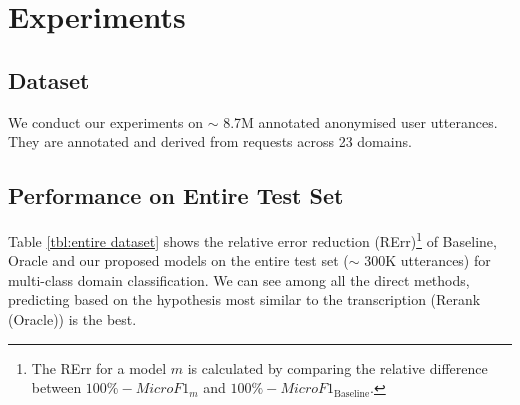 \section{Experiments}
\label{speech:exp}
\subsection{Dataset}
We conduct our experiments on $\sim$ 8.7M annotated anonymised user utterances. They are annotated and derived from requests across 23 domains. 
\subsection{Performance on Entire Test Set}

Table \ref{tbl:entire dataset} shows the relative error reduction (RErr)\footnote{The RErr for a model $m$ is calculated by comparing the relative difference between $100\% - MicroF1_{m}$ and $100\% - MicroF1_{\text{Baseline}}$.  } of Baseline, Oracle and our proposed models on the entire test set ($\sim$ 300K utterances) for multi-class domain classification. 
We can see among all the direct methods, predicting based on the hypothesis most similar to the transcription (Rerank (Oracle)) is the best.


